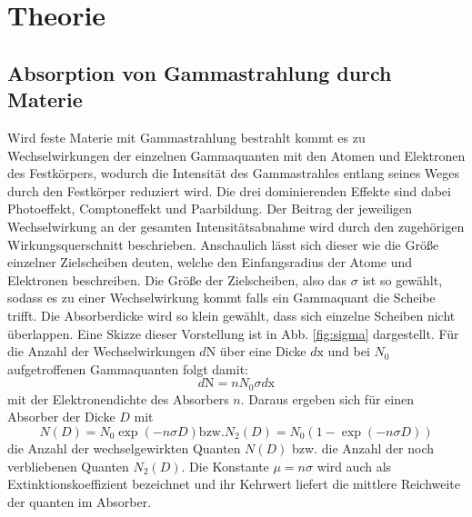 
\section{Theorie}
\label{sec:Theorie}
\subsection{Absorption von Gammastrahlung durch Materie}
Wird feste Materie mit Gammastrahlung bestrahlt  kommt es zu Wechselwirkungen der einzelnen Gammaquanten mit den Atomen und Elektronen des Festkörpers, wodurch die Intensität des Gammastrahles entlang seines Weges durch den Festkörper reduziert wird. Die drei dominierenden Effekte sind dabei Photoeffekt, Comptoneffekt und Paarbildung. Der Beitrag der jeweiligen Wechselwirkung an der gesamten Intensitätsabnahme wird durch den zugehörigen Wirkungsquerschnitt beschrieben. Anschaulich lässt sich dieser wie die Größe einzelner Zielscheiben deuten, welche den Einfangsradius der Atome und Elektronen beschreiben. Die Größe der Zielscheiben, also das $\sigma$ ist so gewählt, sodass es zu einer Wechselwirkung kommt falls ein Gammaquant die Scheibe trifft. Die Absorberdicke wird so klein gewählt, dass sich einzelne Scheiben nicht überlappen. Eine Skizze dieser Vorstellung ist in Abb. \ref{fig:sigma} dargestellt.
Für die Anzahl der Wechselwirkungen $d\text{N}$ über eine Dicke $d\text{x}$ und bei $N_0$ aufgetroffenen Gammaquanten folgt damit:
\begin{equation}
    d\text{N} = n N_0 \sigma d\text{x}
\end{equation}
mit der Elektronendichte des Absorbers $n$. Daraus ergeben sich für einen Absorber der Dicke $D$ mit
\begin{equation}
N(D) = N_0 \exp(-n \sigma D) \text{bzw.}  N_2(D) = N_0 (1 - \exp(-n \sigma D))
\end{equation}
die Anzahl der wechselgewirkten Quanten $N(D)$ bzw. die Anzahl der noch verbliebenen Quanten $N_2(D)$. Die Konstante $ \mu = n \sigma$ wird auch als Extinktionskoeffizient bezeichnet und ihr Kehrwert liefert die mittlere Reichweite der quanten im Absorber.

